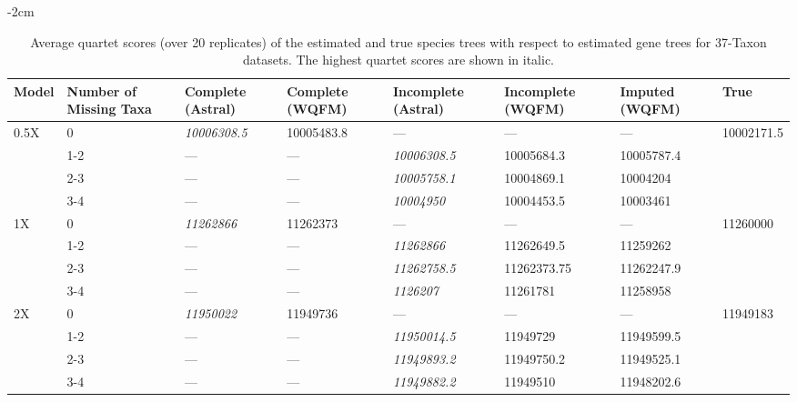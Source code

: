 
\begin{table}[H]
  \small
  \centering
    \addtolength{\leftskip} {-2cm} %
    \addtolength{\rightskip}{-2cm}
    \caption{Average quartet scores (over 20 replicates) of the estimated and true species trees with respect to estimated gene trees for 37-Taxon datasets. %
    The highest quartet scores are shown in italic.}
    \label{tab:qscore-37-complete}
\begin{tabularx}{1.2\textwidth}{|X|X|X|X|X|X|X|X|}


\hline
    Model & Number of Missing Taxa  & Complete (Astral)  & Complete (WQFM) & Incomplete (Astral) & Incomplete (WQFM)  &	Imputed (WQFM) & True \\
    \hline\hline
    \multirow{4}{0.25\textwidth}{0.5X} 
    & 0   & \textit{10006308.5}	& 10005483.8 & --- & --- & --- & \multirow{4}{0.25\textwidth}{ 10002171.5}  \\ \cline{2-7}
    & 1-2 & --- & --- &	\textit{10006308.5}  & 10005684.3	
    & 10005787.4 &  \\ \cline{2-7}
    & 2-3 & --- & ---  & \textit{10005758.1}  &	10004869.1
    & 10004204 & \\ \cline{2-7}
    & 3-4 & ---	& ---  &	\textit{10004950}		
    & 10004453.5	& 10003461 & \\ \cline{2-7}
    \hline
    
    \multirow{4}{0.25\textwidth}{1X} 
    & 0 & \textit{11262866} & 11262373 & --- & --- & --- & \multirow{4}{0.25\textwidth}{11260000}  \\ \cline{2-7}
    & 1-2 & --- & ---  &	\textit{11262866} & 11262649.5
    &	11259262 &  \\ \cline{2-7}
    & 2-3 & --- &	---	 &	\textit{11262758.5}	&	11262373.75
    & 11262247.9 &  \\ \cline{2-7}
    & 3-4 & --- &	---  & \textit{1126207}	
	 &	11261781  &	11258958 &   \\ \cline{2-7}
    \hline
    
    \multirow{4}{0.25\textwidth}{2X} 
    & 0 & \textit{11950022} &	11949736 & --- & --- & --- & \multirow{4}{0.25\textwidth}{11949183}  \\ \cline{2-7}
    & 1-2 & --- &	---  &	\textit{11950014.5}	
    &	11949729  &	11949599.5 & \\ \cline{2-7}
    & 2-3 & --- &	---  &	\textit{11949893.2}		
    &	11949750.2  &	11949525.1 &  \\ \cline{2-7}
    & 3-4 & --- &	---  &	\textit{11949882.2}		
    &	11949510  & 11948202.6 &  \\ \cline{2-7}
    
    \hline
        
    
\end{tabularx}

\end{table}